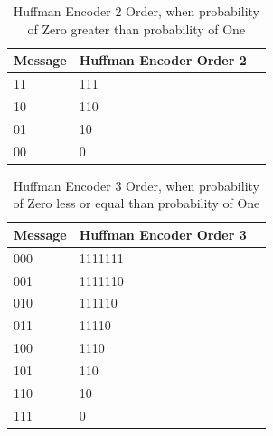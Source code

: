 \begin{refsection}
\begin{table}[H]
\begin{tabular}{|l|l|l|}
\end{tabular}
\end{table}

\begin{table}[H]
\centering
\caption{Huffman Encoder 2 Order, when probability of Zero greater than probability of One}
\label{tb:hufmmanencoder3}
\begin{tabular}{|l|l|l|}
\hline
\textbf{Message}                      & \textbf{Huffman Encoder Order 2}                                       \\ \hline
11                 & 111                                                          \\ \hline
10                 & 110                                                          \\ \hline
01                 & 10                                                         \\ \hline
00                 & 0                                                         \\ \hline

\end{tabular}
\end{table}


\begin{table}[H]
\centering
\caption{Huffman Encoder 3 Order, when probability of Zero less or equal than probability of One}
\label{tb:hufmmanencoder4}
\begin{tabular}{|l|l|l|}
\hline
\textbf{Message}                      & \textbf{Huffman Encoder Order 3}                                       \\ \hline
000                 & 1111111                                                          \\ \hline
001                 & 1111110                                                          \\ \hline
010                 & 111110                                                         \\ \hline
011                 & 11110                                                   \\ \hline
100                 & 1110                                                          \\ \hline
101                 & 110                                                          \\ \hline
110                 & 10                                                         \\ \hline
111                 & 0                                                         \\ \hline
\end{tabular}
\end{table}


\end{refsection}
